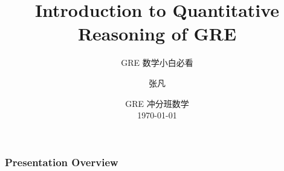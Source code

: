 \documentclass[
	11pt, %
]{beamer}
\title[Into to QR]{Introduction to Quantitative Reasoning of GRE} %
\subtitle{GRE 数学小白必看} %
\author[张凡]{张凡} %
\institute[XDF]{新东方国际教育 \\ \smallskip \textit{zhangfan@xdf.cn}} %
\date[\today]{GRE 冲分班数学 \\ \today} %
\begin{document}

\begin{frame}
	\titlepage %
\end{frame}



\begin{frame}
	\frametitle{Presentation Overview} %
	
	\tableofcontents %
\end{frame}


\end{document}
